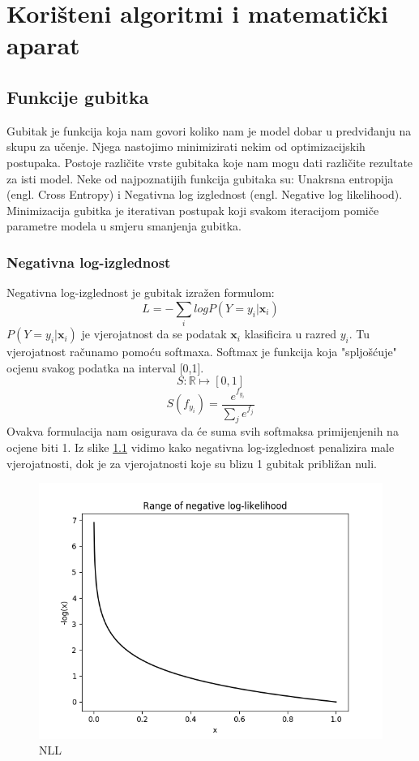 \chapter{Korišteni algoritmi i matematički aparat}

\section{Funkcije gubitka}

Gubitak je funkcija koja nam govori koliko nam je model dobar u predviđanju na skupu za učenje. Njega nastojimo minimizirati nekim od optimizacijskih postupaka. Postoje različite vrste gubitaka koje nam mogu dati različite rezultate za isti model. Neke od najpoznatijih funkcija gubitaka su: Unakrsna entropija (engl. Cross Entropy) i Negativna log izglednost (engl. Negative log likelihood). Minimizacija gubitka je iterativan postupak koji svakom iteracijom pomiče parametre modela u smjeru smanjenja gubitka.

\subsection{Negativna log-izglednost}
	Negativna log-izglednost je gubitak izražen formulom:
	\[
		L = -\sum_{i}log P(Y = y_i | \textbf{x}_i)
	\]
	$P(Y = y_i | \textbf{x}_i)$ je vjerojatnost da se podatak $\textbf{x}_i$ klasificira u razred $y_i$.
	Tu vjerojatnost računamo pomoću softmaxa. Softmax je funkcija koja "spljošćuje" ocjenu svakog podatka na interval [0,1].
	\[
	S : \mathbb{R} \mapsto [0,1]
	\]
	\[
	S(f_{y_i}) = \frac{e^{f_{y_i}}}{\sum_{j} e^{f_j}}
	\]
	Ovakva formulacija nam osigurava da će suma svih softmaksa primijenjenih na ocjene biti 1. Iz slike \ref{fig:NLL} vidimo kako negativna log-izglednost penalizira male vjerojatnosti, dok je za vjerojatnosti koje su blizu 1 gubitak približan nuli.
	\begin{figure}[H]
		\centering\includegraphics[scale=0.5]{slike/neg_log.png}
		\caption{NLL \cite{miranda2017softmax}}
		\label{fig:NLL}
	\end{figure}

